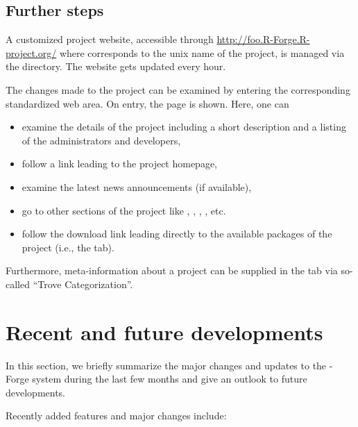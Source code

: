 \subsection{Further steps}

A customized project website, accessible through
\url{http://foo.R-Forge.R-project.org/} where 
corresponds to the unix name of the project, is managed via the
 directory. The website gets updated every hour.

The changes made to the project can be examined by entering the
corresponding standardized web area. On entry, the 
page is shown. Here, one can

\begin{itemize}
\item examine the details of the project including a short
  description and a listing of the administrators and developers,
\item follow a link leading to the project homepage,
\item examine the latest news announcements (if available),
\item go to other sections of the project like
  , ,
   , , etc.
\item follow the download link leading directly to the available
  packages of the project (i.e., the  tab).
\end{itemize}

Furthermore, meta-information about a project can be supplied in
the  tab via so-called ``Trove Categorization''.


\section*{Recent and future developments}

In this section, we briefly summarize the major changes and updates to
the \R{}-Forge system during the last few months and give an outlook to
future developments.

Recently added features and major changes include:

